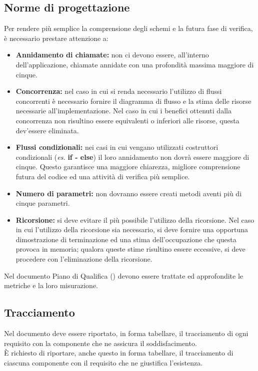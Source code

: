 {\subsection{Norme di progettazione}{
Per rendere più semplice la comprensione degli schemi e la futura fase di verifica, è necessario prestare attenzione a:
\begin{itemize}
	\item {\textbf{Annidamento di chiamate:}} {non ci devono essere, all'interno dell'applicazione, chiamate annidate con una profondità massima maggiore di cinque.
	}
	\item {\textbf{Concorrenza:}} {nel caso in cui si renda necessario l'utilizzo di flussi concorrenti è necessario fornire il diagramma di flusso e la stima delle risorse necessarie all'implementazione. Nel caso in cui i benefici ottenuti dalla concorrenza non risultino essere equivalenti o inferiori alle risorse, questa dev'essere eliminata.	
	}
	\item {\textbf{Flussi condizionali:}} {nei casi in cui vengano utilizzati costruttori condizionali (\textit{es.} \textbf{if - else}) il loro annidamento non dovrà essere maggiore di cinque. Questo garantisce una maggiore chiarezza, migliore comprensione futura del codice ed una attività di verifica più semplice.
	}
	\item {\textbf{Numero di parametri:}} {non dovranno essere creati metodi aventi più di cinque parametri.
	}
	\item {\textbf{Ricorsione:}} {si deve evitare il più possibile l'utilizzo della ricorsione. Nel caso in cui l'utilizzo della ricorsione sia necessario, si deve fornire una opportuna dimostrazione di terminazione ed una stima dell'occupazione che questa provoca in memoria; qualora queste stime risultino essere eccessive, si deve procedere con l'eliminazione della ricorsione.
	}
\end{itemize}
Nel documento Piano di Qualifica (\textit{\PianoDiQualifica}) devono essere trattate ed approfondite le metriche  e la loro misurazione.
}%

\subsection{Tracciamento} {\label{paTraccia}
Nel documento deve essere riportato, in forma tabellare, il tracciamento di ogni requisito con la componente che ne assicura il soddisfacimento.\\
\`E richiesto di riportare, anche questo in forma tabellare, il tracciamento di ciascuna componente con il requisito che ne giustifica l'esistenza.
}%

}
